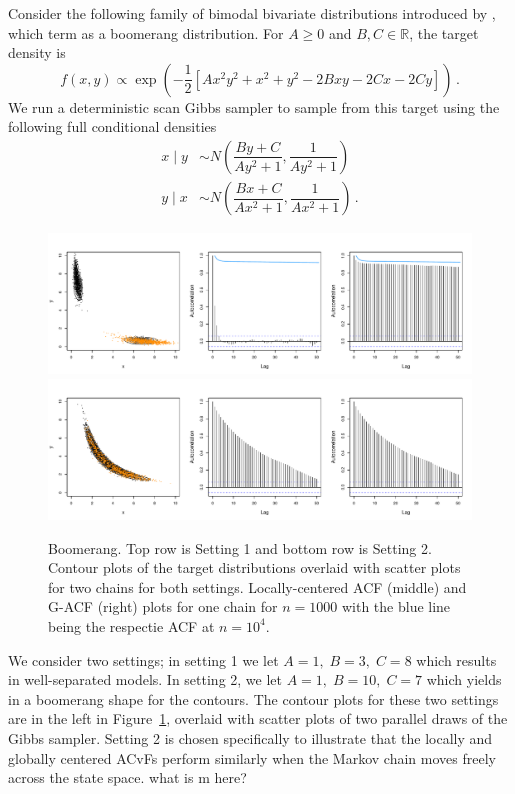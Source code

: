 \documentclass[11pt]{article}
\theoremstyle{remark}
\begin{document}
Consider the following family of bimodal bivariate distributions introduced by \cite{gelman1991note}, which term as a boomerang distribution. For $A \geq 0$ and $B, C  \in \mathbb{R}$, the target density is
%
\[
f(x, y) \propto \exp\left(-\dfrac{1}{2} \left[Ax^2y^2 + x^2 + y^2 -2Bxy  -2Cx - 2Cy  \right]\right)\,.
\]
We run a deterministic scan Gibbs sampler to sample from this target using the following full conditional densities
%
\begin{align*}
    x \mid y &\sim N\left(\dfrac{By + C}{Ay^2 + 1}, \dfrac{1}{Ay^2 + 1}\right)\\
    y \mid x &\sim N\left(\dfrac{Bx + C}{Ax^2 + 1}, \dfrac{1}{Ax^2 + 1}\right)\,.
\end{align*}


\begin{figure}[h]
    \centering
    \includegraphics[width = .8\textwidth]{plots/boom-all_1_3_8.pdf}\\
    \includegraphics[width = .8\textwidth]{plots/boom-all_1_10_7.pdf}    

    \caption{Boomerang. Top row is Setting 1 and bottom row is Setting 2. Contour plots of the target distributions  overlaid with scatter plots for two chains for both settings.  Locally-centered ACF (middle) and G-ACF (right) plots for one chain for $n = 1000$ with the blue line being the respectie ACF at $n = 10^4$.  }
   \label{fig:boom-2D}
\end{figure}

We consider two settings; in setting 1 we let
$A = 1,\; B = 3,\; C = 8$ which results in well-separated models. In setting 2, we let $A = 1, \; B = 10, \; C=7$ which yields in a boomerang shape for the contours. The contour plots for these two settings are in the left in Figure~\ref{fig:boom-2D}, overlaid with scatter plots of two parallel draws of the Gibbs sampler. Setting 2 is chosen specifically to illustrate that the locally and globally centered ACvFs perform similarly when the Markov chain moves freely across the state space.  {\color{red} what is m here?}
\end{document}
